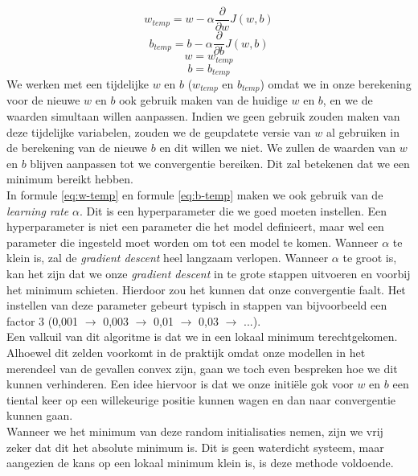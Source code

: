 \begin{equation}
	w_{temp} = w - \alpha \frac{\partial}{\partial w} J(w, b)
	\label{eq:w-temp}
\end{equation}
\begin{equation}
	b_{temp} = b - \alpha \frac{\partial}{\partial b} J(w, b)
	\label{eq:b-temp}
\end{equation}
\begin{equation}
	w = w_{temp} 
\end{equation}
\begin{equation}
	b = b_{temp}
\end{equation}
\noindent
We werken met een tijdelijke $w$ en $b$ ($w_{temp}$ en $b_{temp}$) omdat we in onze berekening voor de nieuwe $w$ en $b$ ook gebruik maken van de huidige $w$ en $b$, en we de waarden simultaan willen aanpassen. Indien we geen gebruik zouden maken van deze tijdelijke variabelen, zouden we de geupdatete versie van $w$ al gebruiken in de berekening van de nieuwe $b$ en dit willen we niet. We zullen de waarden van $w$ en $b$ blijven aanpassen tot we convergentie bereiken. Dit zal betekenen dat we een minimum bereikt hebben. \\
\newline
In formule \ref{eq:w-temp} en formule \ref{eq:b-temp} maken we ook gebruik van de \textit{learning rate} $\alpha$. Dit is een hyperparameter die we goed moeten instellen. Een hyperparameter is niet een parameter die het model definieert, maar wel een parameter die ingesteld moet worden om tot een model te komen. Wanneer $\alpha$ te klein is, zal de \textit{gradient descent} heel langzaam verlopen. Wanneer $\alpha$ te groot is, kan het zijn dat we onze \textit{gradient descent} in te grote stappen uitvoeren en voorbij het minimum schieten. Hierdoor zou het kunnen dat onze convergentie faalt. Het instellen van deze parameter gebeurt typisch in stappen van bijvoorbeeld een factor 3 (0,001 $\rightarrow$ 0,003 $\rightarrow$ 0,01 $\rightarrow$ 0,03 $\rightarrow$ ...). \\
\newline
Een valkuil van dit algoritme is dat we in een lokaal minimum terechtgekomen. Alhoewel dit zelden voorkomt in de praktijk omdat onze modellen in het merendeel van de gevallen convex zijn, gaan we toch even bespreken hoe we dit kunnen verhinderen. Een idee hiervoor is dat we onze initiële gok voor $w$ en $b$ een tiental keer op een willekeurige positie kunnen wagen en dan naar convergentie kunnen gaan. \\
\newline
Wanneer we het minimum van deze random initialisaties nemen, zijn we vrij zeker dat dit het absolute minimum is. Dit is geen waterdicht systeem, maar aangezien de kans op een lokaal minimum klein is, is deze methode voldoende.

